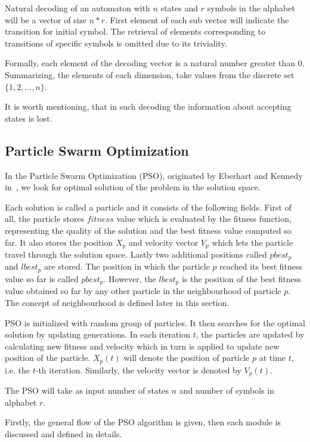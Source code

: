 \documentclass{article}
\begin{document}
Natural decoding of an automaton with $n$ states and $r$ symbols in the alphabet will be a vector of size $n*r$. First element of each sub vector will indicate the transition for initial symbol. The retrieval of elements corresponding to transitions of specific symbols is omitted due to its triviality.

Formally, each element of the decoding vector is a natural number greater than 0. Summarizing, the elements of each dimension, take values from the discrete set $\{1,2, \ldots, n\}$.

It is worth mentioning, that in such decoding the information about accepting states is lost.





\subsection{Particle Swarm Optimization}
In the Particle Swarm Optimization (PSO), originated by Eberhart and Kennedy in~\cite{pso_origin}, we look for optimal solution of the problem in the solution space. 

Each solution is called a particle and it consists of the following fields. First of all, the particle stores $fitness$ value which is evaluated by the fitness function, representing the quality of the solution and the best fitness value computed so far. It also stores the position $X_p$ and velocity vector $V_p$ which lets the particle travel through the solution space. Lastly two additional positions called $pbest_p$ and $lbest_p$ are stored. The position in which the particle $p$ reached its best fitness value so far is called $pbest_p$. However, the $lbest_p$ is the position of the best fitness value obtained so far by any other particle in the neighbourhood of particle $p$. The concept of neighbourhood is defined later in this section.

PSO is initialized with random group of particles. It then searches for the optimal solution by updating generations.
In each iteration $t$, the particles are updated by calculating new fitness and velocity which in turn is applied to update new position of the particle. $X_p(t)$ will denote the position of particle $p$ at time $t$, i.e. the $t$-th iteration. Similarly, the velocity vector is denoted by $V_p(t)$.

The PSO will take as input number of states $n$ and number of symbols in alphabet $r$.

Firstly, the general flow of the PSO algorithm is given, then each module is discussed and defined in details.
\end{document}

